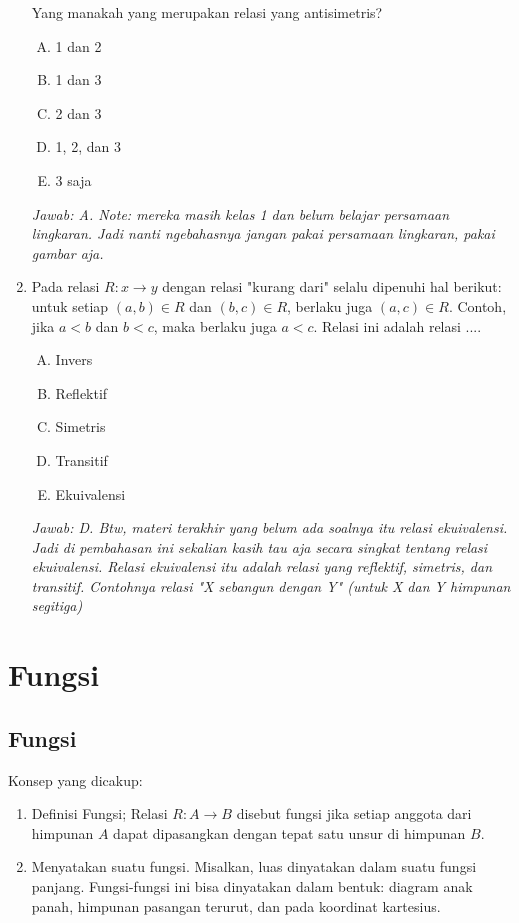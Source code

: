 \documentclass[fleqn, a4paper, 12pt]{article} %
\begin{document}
\begin{enumerate}
			Yang manakah yang merupakan relasi yang antisimetris?
			
			\begin{enumerate}[(A)]
				\item 1 dan 2 
				\item 1 dan 3
				\item 2 dan 3
				\item 1, 2, dan 3
				\item 3 saja
			\end{enumerate}
			
			\textit{Jawab: A. Note: mereka masih kelas 1 dan belum belajar persamaan lingkaran. Jadi nanti ngebahasnya jangan pakai persamaan lingkaran, pakai gambar aja.}
		
		\item Pada relasi $R: x \rightarrow y$ dengan relasi "kurang dari" selalu dipenuhi hal berikut: untuk setiap $(a, b) \in R$ dan $(b, c) \in R$, berlaku juga $(a, c) \in R$. Contoh, jika $a < b$ dan $b < c$, maka berlaku juga $a < c$. Relasi ini adalah relasi ....
		
			\begin{enumerate}[(A)]
				\item Invers
				\item Reflektif
				\item Simetris
				\item Transitif
				\item Ekuivalensi
			\end{enumerate}
			
			\textit{Jawab: D. Btw, materi terakhir yang belum ada soalnya itu relasi ekuivalensi. Jadi di pembahasan ini sekalian kasih tau aja secara singkat tentang relasi ekuivalensi. Relasi ekuivalensi itu adalah relasi yang reflektif, simetris, dan transitif. Contohnya relasi "X sebangun dengan Y" (untuk X dan Y himpunan segitiga)}
	\end{enumerate}
	
\section{Fungsi}

	\subsection{Fungsi}
	
	Konsep yang dicakup:
	
	\begin{enumerate}
		\item Definisi Fungsi; Relasi $R: A \rightarrow B$ disebut fungsi jika setiap anggota dari himpunan $A$ dapat dipasangkan dengan tepat satu unsur di himpunan $B$.
		\item Menyatakan suatu fungsi. Misalkan, luas dinyatakan dalam suatu fungsi panjang. Fungsi-fungsi ini bisa dinyatakan dalam bentuk: diagram anak panah, himpunan pasangan terurut, dan pada koordinat kartesius.		
	\end{enumerate}
	
\end{document}
